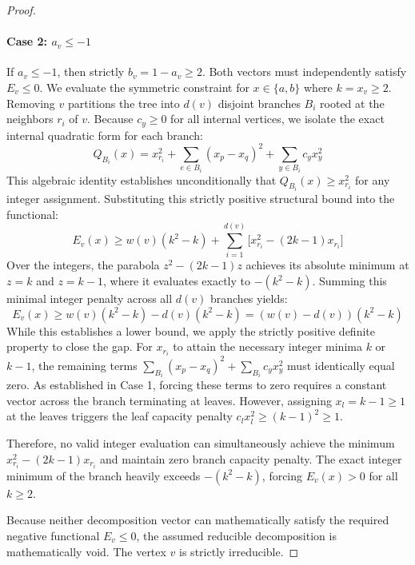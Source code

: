 \begin{proof}
\paragraph{Case 2: $a_v \le -1$}
If $a_v \le -1$, then strictly $b_v = 1 - a_v \ge 2$. Both vectors must independently satisfy $E_v \le 0$. We evaluate the symmetric constraint for $x \in \{a, b\}$ where $k = x_v \ge 2$. 
Removing $v$ partitions the tree into $d(v)$ disjoint branches $B_i$ rooted at the neighbors $r_i$ of $v$. Because $c_y \ge 0$ for all internal vertices, we isolate the exact internal quadratic form for each branch:
\[
Q_{B_i}(x) = x_{r_i}^2 + \sum_{e \in B_i} (x_p - x_q)^2 + \sum_{y \in B_i} c_y x_y^2
\]
This algebraic identity establishes unconditionally that $Q_{B_i}(x) \ge x_{r_i}^2$ for any integer assignment. 
Substituting this strictly positive structural bound into the functional:
\[
E_v(x) \ge w(v)(k^2 - k) + \sum_{i=1}^{d(v)} \big[ x_{r_i}^2 - (2k-1)x_{r_i} \big]
\]
Over the integers, the parabola $z^2 - (2k-1)z$ achieves its absolute minimum at $z = k$ and $z = k-1$, where it evaluates exactly to $-(k^2 - k)$. 
Summing this minimal integer penalty across all $d(v)$ branches yields:
\[
E_v(x) \ge w(v)(k^2 - k) - d(v)(k^2 - k) = (w(v) - d(v))(k^2 - k)
\]
While this establishes a lower bound, we apply the strictly positive definite property to close the gap. For $x_{r_i}$ to attain the necessary integer minima $k$ or $k-1$, the remaining terms $\sum_{B_i} (x_p - x_q)^2 + \sum_{B_i} c_y x_y^2$ must identically equal zero. As established in Case 1, forcing these terms to zero requires a constant vector across the branch terminating at leaves. However, assigning $x_l = k-1 \ge 1$ at the leaves triggers the leaf capacity penalty $c_l x_l^2 \ge (k-1)^2 \ge 1$. 

Therefore, no valid integer evaluation can simultaneously achieve the minimum $x_{r_i}^2 - (2k-1)x_{r_i}$ and maintain zero branch capacity penalty. The exact integer minimum of the branch heavily exceeds $-(k^2-k)$, forcing $E_v(x) > 0$ for all $k \ge 2$. 

Because neither decomposition vector can mathematically satisfy the required negative functional $E_v \le 0$, the assumed reducible decomposition is mathematically void. The vertex $v$ is strictly irreducible.
\end{proof}